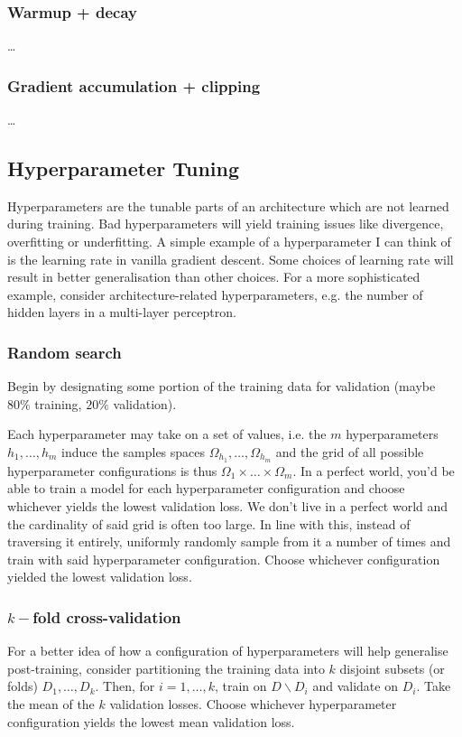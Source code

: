 \documentclass[11pt]{article}
\begin{document}
\subsubsection{\NEXT Warmup + decay}
\dots

\subsubsection{Gradient accumulation + clipping}
\dots

\subsection{Hyperparameter Tuning}
Hyperparameters are the tunable parts of an architecture which are not learned during training. Bad hyperparameters will yield training issues like divergence, overfitting or underfitting. A simple example of a hyperparameter I can think of is the learning rate in vanilla gradient descent. Some choices of learning rate will result in better generalisation than other choices. For a more sophisticated example, consider architecture-related hyperparameters, e.g. the number of hidden layers in a multi-layer perceptron.

\subsubsection{Random search}
Begin by designating some portion of the training data for validation (maybe $80\%$ training, $20\%$ validation). 

Each hyperparameter may take on a set of values, i.e. the $m$ hyperparameters $h_1,\dots,h_m$ induce the samples spaces $\Omega_{h_1},\dots,\Omega_{h_m}$ and the grid of all possible hyperparameter configurations is thus $\Omega_1\times\dots\times\Omega_m$. In a perfect world, you'd be able to train a model for each hyperparameter configuration and choose whichever yields the lowest validation loss. We don't live in a perfect world and the cardinality of said grid is often too large. In line with this, instead of traversing it entirely, uniformly randomly sample from it a number of times and train with said hyperparameter configuration. Choose whichever configuration yielded the lowest validation loss.

\subsubsection{$k-$fold cross-validation}
For a better idea of how a configuration of hyperparameters will help generalise post-training, consider partitioning the training data into $k$ disjoint subsets (or folds) $D_1,\dots,D_k$. Then, for $i=1,\dots,k$, train on $D\backslash D_i$ and validate on $D_i$. Take the mean of the $k$ validation losses. Choose whichever hyperparameter configuration yields the lowest mean validation loss.
\end{document}
